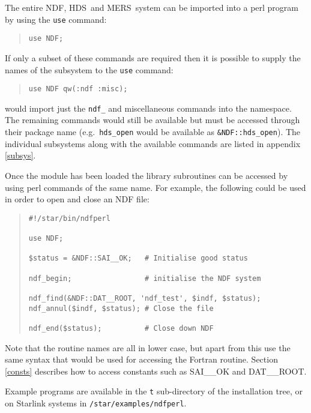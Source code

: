 \documentclass[twoside,11pt]{article}
\newcommand{\ndf}{\xref{NDF}{sun33}{}}
\newcommand{\hds}{\xref{HDS}{sun92}{}}
\newcommand{\mers}{\xref{MERS}{sun104}{}}
\newenvironment{myquote}{\begin{quote}\begin{small}}{\end{small}\end{quote}}
\newcommand{\xref}[3]{#1}
\begin{document}
The entire \ndf, \hds\ and \mers\ system can be imported into a perl program
by using the \texttt{use} command:

\begin{myquote}
\begin{verbatim}
use NDF;
\end{verbatim}
\end{myquote}

If only a subset of these commands are required then it is possible to supply
the names of the subsystem to the \texttt{use} command:

\begin{myquote}
\begin{verbatim}
use NDF qw(:ndf :misc);
\end{verbatim}
\end{myquote}
would import just the \texttt{ndf\_} and miscellaneous commands into the
namespace. The remaining commands would still be available but must be
accessed through their package name (e.g.\ \texttt{hds\_open} would be
available as \texttt{\&NDF::hds\_open}). The individual subsystems along with
the available commands are listed in appendix \ref{subsys}.

Once the module has been loaded the library subroutines can be accessed 
by using perl commands of the same name. For example, the following could be
used in order to open
and close an NDF file:

\begin{myquote}
\begin{verbatim}
#!/star/bin/ndfperl

use NDF;

$status = &NDF::SAI__OK;   # Initialise good status

ndf_begin;                 # initialise the NDF system

ndf_find(&NDF::DAT__ROOT, 'ndf_test', $indf, $status);
ndf_annul($indf, $status); # Close the file

ndf_end($status);          # Close down NDF
\end{verbatim}
\end{myquote}
Note that the routine names are all in lower case, but apart from this use the 
same syntax that would be used for accessing the Fortran routine.
Section \ref{consts} describes how to access constants such as SAI\_\_OK and
DAT\_\_ROOT.

Example programs are available in the {\tt t} sub-directory of the installation
tree, or on Starlink systems in \texttt{/star/examples/ndfperl}.
\end{document}
